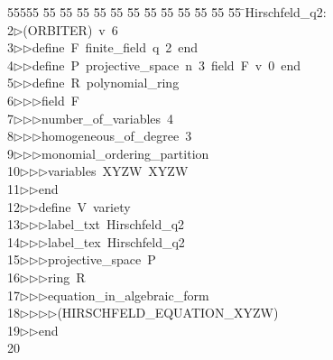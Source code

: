 %
%
\begin{tabbing}
55555 \= 55 \= 55 \= 55 \= 55 \= 55 \= 55 \= 55 \= 55 \= 55 \= 55 \= 55 \= 55 \= \>Hirschfeld\_q2:\\[0pt]
2\>$\triangleright$\>(ORBITER)\ v\ 6\ \\[0pt]
3\>$\triangleright$\>$\triangleright$\>define\ F\ finite\_field\ q\ 2\ end\ \\[0pt]
4\>$\triangleright$\>$\triangleright$\>define\ P\ projective\_space\ n\ 3\ field\ F\ v\ 0\ end\ \\[0pt]
5\>$\triangleright$\>$\triangleright$\>define\ R\ polynomial\_ring\ \\[0pt]
6\>$\triangleright$\>$\triangleright$\>$\triangleright$\>field\ F\ \\[0pt]
7\>$\triangleright$\>$\triangleright$\>$\triangleright$\>number\_of\_variables\ 4\ \\[0pt]
8\>$\triangleright$\>$\triangleright$\>$\triangleright$\>homogeneous\_of\_degree\ 3\ \\[0pt]
9\>$\triangleright$\>$\triangleright$\>$\triangleright$\>monomial\_ordering\_partition\ \\[0pt]
10\>$\triangleright$\>$\triangleright$\>$\triangleright$\>variables\ XYZW\ XYZW\ \\[0pt]
11\>$\triangleright$\>$\triangleright$\>end\ \\[0pt]
12\>$\triangleright$\>$\triangleright$\>define\ V\ variety\ \\[0pt]
13\>$\triangleright$\>$\triangleright$\>$\triangleright$\>label\_txt\ Hirschfeld\_q2\ \\[0pt]
14\>$\triangleright$\>$\triangleright$\>$\triangleright$\>label\_tex\ Hirschfeld\_q2\ \\[0pt]
15\>$\triangleright$\>$\triangleright$\>$\triangleright$\>projective\_space\ P\ \\[0pt]
16\>$\triangleright$\>$\triangleright$\>$\triangleright$\>ring\ R\ \\[0pt]
17\>$\triangleright$\>$\triangleright$\>$\triangleright$\>equation\_in\_algebraic\_form\ \\[0pt]
18\>$\triangleright$\>$\triangleright$\>$\triangleright$\>$\triangleright$\>(HIRSCHFELD\_EQUATION\_XYZW)\ \\[0pt]
19\>$\triangleright$\>$\triangleright$\>end\\[0pt]
20\>\end{tabbing}
